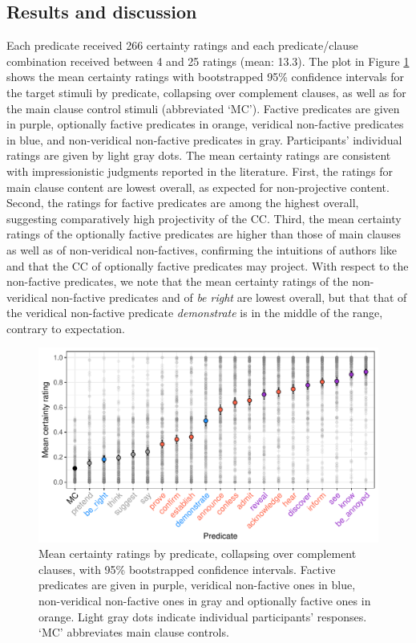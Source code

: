 \documentclass[11pt,fleqn]{article}
\newcommand{\6}{\mbox{$[\hspace*{-.6mm}[$}}
\newcommand{\9}{\mbox{$]\hspace*{-.6mm}]$}}
\begin{document}
\subsection{Results and discussion}

Each predicate received 266 certainty ratings and each predicate/clause combination received between 4 and 25 ratings (mean: 13.3). The plot in Figure \ref{f-projectivity} shows the mean certainty ratings with bootstrapped 95\% confidence intervals for the target stimuli by predicate, collapsing over complement clauses, as well as for the main clause control stimuli (abbreviated `MC'). Factive predicates are given in purple, optionally factive predicates in orange, veridical non-factive predicates in blue, and non-veridical non-factive predicates in gray. Participants' individual ratings are given by light gray dots.  The mean certainty ratings are consistent with impressionistic judgments reported in the literature. First, the ratings for main clause content are lowest overall, as expected for non-projective content. Second, the ratings for factive predicates are among the highest overall, suggesting comparatively high projectivity of the CC. Third, the mean certainty ratings of the optionally factive predicates are higher than those of main clauses as well as of non-veridical non-factives, confirming the intuitions of authors like \citet{kiparsky-kiparsky70,schlenker10,anand-hacquard2014} and \citet{spector-egre2015} that the CC of optionally factive predicates may project. With respect to the non-factive predicates, we note that the mean certainty ratings of the non-veridical non-factive predicates and of {\em be right} are lowest overall, but that that of the veridical non-factive predicate {\em demonstrate} is in the middle of the range, contrary to expectation. 

\begin{figure}[H]
\centering

\includegraphics[width=.7\paperwidth]{../results/5-projectivity-no-fact/graphs/means-projectivity-by-predicate-variability}

\caption{Mean certainty ratings by predicate, collapsing over complement clauses, with 95\% bootstrapped confidence intervals. Factive predicates are given in purple, veridical non-factive ones in blue, non-veridical non-factive ones in gray and optionally factive ones in orange. Light gray dots indicate individual participants' responses. `MC' abbreviates main clause controls.}
\label{f-projectivity}
\end{figure}
\end{document}
